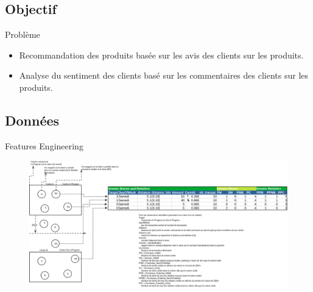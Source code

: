 \documentclass[xelatex,12pt]{beamer}
\begin{document}
\subsection{Objectif}

\begin{frame}{Problème}
  \begin{itemize}
  \item Recommandation des produits basée sur les avis des clients sur les produits.
  \item Analyse du sentiment des clients basé sur les commentaires des clients sur les produits.
  \end{itemize}
\end{frame}

\subsection{Données}
\begin{frame}{Features Engineering }
\begin{figure}[H]
    \includegraphics[width=11.5cm,height=5.5cm]{images/feature_engineering.png}
    \label{fig:L1}
\end{figure}
\end{frame}
\end{document}

